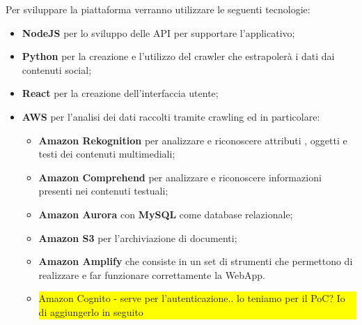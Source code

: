 Per sviluppare la piattaforma verranno utilizzare le seguenti tecnologie:
\begin{itemize}
    \item \textbf{NodeJS} \glo{} per lo sviluppo delle API \glo{} per supportare l’applicativo;
    \item \textbf{Python} per la creazione e l'utilizzo del crawler che estrapolerà i dati dai contenuti social;
    \item \textbf{React} per la creazione dell'interfaccia utente;
    \item \textbf{AWS} \glo{} per l'analisi dei dati raccolti tramite crawling \glo{} ed in particolare:
    \begin{itemize}
    	\item \textbf{Amazon Rekognition} per analizzare e riconoscere attributi \glo{}, oggetti e testi dei contenuti multimediali;
    	\item \textbf{Amazon Comprehend} per analizzare e riconoscere informazioni presenti nei contenuti testuali;
    	\item \textbf{Amazon Aurora} con \textbf{MySQL} come database relazionale;
    	\item \textbf{Amazon S3} per l'archiviazione di documenti;
    	\item \textbf{Amazon Amplify} che consiste in un set di strumenti che permettono di realizzare e far funzionare correttamente la WebApp.
    	\item {\colorbox{yellow}{\parbox{0.8\textwidth}{Amazon Cognito - serve per l'autenticazione.. lo teniamo per il PoC? Io di aggiungerlo in seguito}}}
	\end{itemize}
  \end{itemize}